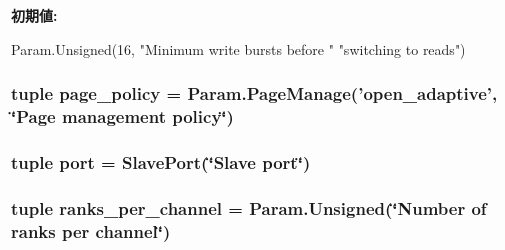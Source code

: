 \label{classDRAMCtrl_1_1DRAMCtrl_aae741e23886d2d87de163d08ce065b7a}
{\bfseries 初期値:}
\begin{DoxyCode}
Param.Unsigned(16, "Minimum write bursts before "
                                           "switching to reads")
\end{DoxyCode}
\hypertarget{classDRAMCtrl_1_1DRAMCtrl_acdcd49cb93b86bb634e7f962e22cff9e}{
\subsubsection[{page\_\-policy}]{\setlength{\rightskip}{0pt plus 5cm}tuple {\bf page\_\-policy} = Param.PageManage('open\_\-adaptive', \char`\"{}Page management policy\char`\"{})}}
\label{classDRAMCtrl_1_1DRAMCtrl_acdcd49cb93b86bb634e7f962e22cff9e}
\hypertarget{classDRAMCtrl_1_1DRAMCtrl_a1aadf525515ecfcf662c2aa51a503763}{
\subsubsection[{port}]{\setlength{\rightskip}{0pt plus 5cm}tuple {\bf port} = {\bf SlavePort}(\char`\"{}Slave {\bf port}\char`\"{})}}
\label{classDRAMCtrl_1_1DRAMCtrl_a1aadf525515ecfcf662c2aa51a503763}
\hypertarget{classDRAMCtrl_1_1DRAMCtrl_aa95cbd3a64893b94d352bece9d0c9794}{
\subsubsection[{ranks\_\-per\_\-channel}]{\setlength{\rightskip}{0pt plus 5cm}tuple {\bf ranks\_\-per\_\-channel} = Param.Unsigned(\char`\"{}Number of ranks per channel\char`\"{})}}
\label{classDRAMCtrl_1_1DRAMCtrl_aa95cbd3a64893b94d352bece9d0c9794}


